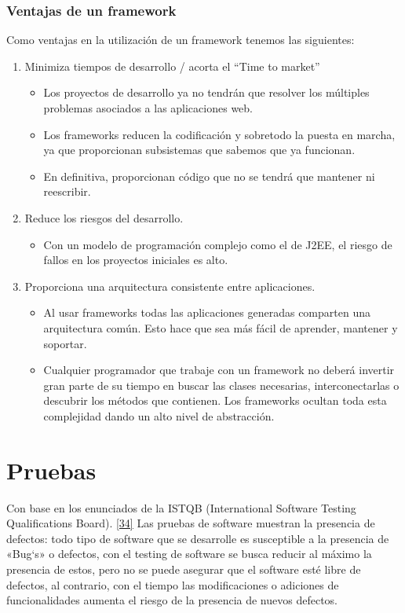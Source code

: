 \subsubsection {Ventajas de un framework}
Como ventajas en la utilización de un framework tenemos las siguientes:

\begin{enumerate}
	\item Minimiza tiempos de desarrollo / acorta el “Time to market”
	\begin{itemize}
	\item Los proyectos de desarrollo ya no tendrán que resolver los múltiples problemas asociados a las aplicaciones web.
	\item  Los frameworks reducen la codificación y sobretodo la puesta en marcha, ya que proporcionan subsistemas que sabemos que ya funcionan. \item  En definitiva, proporcionan código que no se tendrá que mantener ni reescribir.
	\end{itemize}
	\item Reduce los riesgos del desarrollo.
	\begin{itemize}
		\item Con un modelo de programación complejo como el de J2EE, el riesgo de fallos en los proyectos iniciales es alto.
	\end{itemize}
	\item Proporciona una arquitectura consistente entre aplicaciones.
	\begin{itemize}
		\item Al usar frameworks todas las aplicaciones generadas comparten una arquitectura común. Esto hace que sea más fácil de aprender, mantener y soportar.
		\item Cualquier programador que trabaje con un framework no deberá invertir gran parte de su tiempo en buscar las clases necesarias, interconectarlas o descubrir los métodos que contienen. Los frameworks ocultan toda esta complejidad dando un alto nivel de abstracción. 
	\end{itemize}
\end{enumerate}

\section{Pruebas}

Con base en los enunciados de la ISTQB (International Software Testing Qualifications Board). \hyperlink{b34}{[34]} Las pruebas de software muestran la presencia de defectos: todo tipo de software que se desarrolle es susceptible a la presencia de «Bug`s» o defectos, con el testing de software se busca reducir al máximo la presencia de estos, pero no se puede asegurar que el software esté libre de defectos, al contrario, con el tiempo las modificaciones o adiciones de funcionalidades aumenta el riesgo de la presencia de nuevos defectos.

